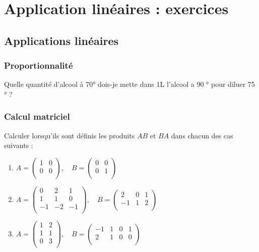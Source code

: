 \documentclass{book}
\begin{document}
\chapter*{Application linéaires : exercices}
\section{Applications linéaires}
\subsection{Proportionnalité} 
\begin{Exercice}[Dilution]
Quelle quantité d'alcool à 70°  dois-je mette dans  1L l'alcool a 90 ° pour  diluer  75 ° ?
\end{Exercice}

\subsection{Calcul matriciel} 
\begin{Exercice}
Calculer lorsqu'ils sont définis les produits $AB$ et $BA$ dans chacun des cas suivants :
\begin{enumerate}
\item $\displaystyle A= \left(\begin{array}{cc}
1  &  0  \\
0  &  0 \\
\end{array}\right),\quad 
B=\left(\begin{array}{cc}
0  &  0  \\
0  &  1 \\
\end{array}\right)
$
\item $\displaystyle A=\left(\begin{array}{ccc}
0 & 2 & 1\\
1 & 1 & 0\\
-1&-2 &-1\\
\end{array}\right),\quad
B=\left(\begin{array}{ccc}
2 & 0 & 1\\
-1& 1 & 2\\
\end{array}\right)
$
\item $\displaystyle A=\left(\begin{array}{cc}
1 & 2 \\
1 & 1 \\
0 & 3 \\
\end{array}\right),
\quad B=\left(\begin{array}{cccc}
-1 & 1 & 0& 1 \\
2 & 1 & 0& 0 \\
\end{array}\right)
$
\end{enumerate}
\end{Exercice}
\end{document}
